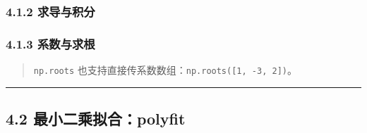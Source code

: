 \subsubsection{4.1.2 求导与积分}\label{ux6c42ux5bfcux4e0eux79efux5206}

\begin{Shaded}
\begin{Highlighting}[]
\OperatorTok{=}\NormalTok{ np.poly1d([}\NormalTok{, }\NormalTok{, }\NormalTok{])}
\NormalTok{))     }
\OperatorTok{=}\NormalTok{))   }
\end{Highlighting}
\end{Shaded}

\subsubsection{4.1.3 系数与求根}\label{ux7cfbux6570ux4e0eux6c42ux6839}

\begin{Shaded}
\begin{Highlighting}[]
\OperatorTok{=}\NormalTok{ np.poly1d([}\NormalTok{, }\OperatorTok{{-}}\NormalTok{, }\NormalTok{])     }
\CommentTok{\# [ 1. {-}3.  2.]}
\CommentTok{\# [2. 1.]}
\end{Highlighting}
\end{Shaded}

\begin{quote}
\texttt{np.roots}
也支持直接传系数数组：\texttt{np.roots({[}1,\ -3,\ 2{]})}。
\end{quote}

\begin{center}\rule{0.5\linewidth}{0.5pt}\end{center}

\subsection{4.2
最小二乘拟合：polyfit}\label{ux6700ux5c0fux4e8cux4e58ux62dfux5408polyfit}

